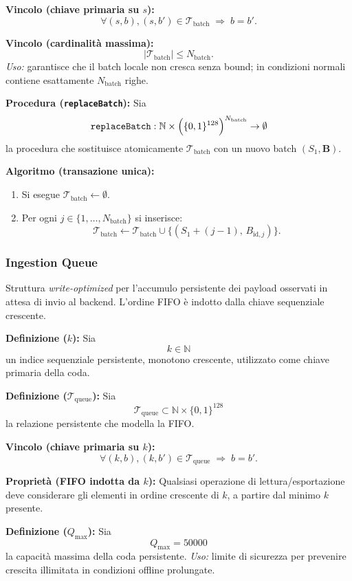 \documentclass[a4paper,11pt,table,dvipsnames]{article}
\begin{document}
\textbf{Vincolo (chiave primaria su \(s\)):}
\[
    \forall (s,b),(s,b') \in \mathcal{T}_{\text{batch}} \;\Rightarrow\; b=b'.
\]

\textbf{Vincolo (cardinalità massima):}
\[
    |\mathcal{T}_{\text{batch}}| \le N_{\text{batch}}.
\]
\emph{Uso:} garantisce che il batch locale non cresca senza bound; in condizioni normali contiene esattamente \(N_{\text{batch}}\) righe.

\textbf{Procedura (\texttt{replaceBatch}):}
Sia
\[
    \texttt{replaceBatch}: \mathbb{N} \times \Bigl(\{0,1\}^{128}\Bigr)^{N_{\text{batch}}} \rightarrow \emptyset
\]
la procedura che sostituisce atomicamente \(\mathcal{T}_{\text{batch}}\) con un nuovo batch \((S_1,\mathbf{B})\).

\textbf{Algoritmo (transazione unica):}
\begin{enumerate}
    \item Si esegue \(\mathcal{T}_{\text{batch}} \leftarrow \emptyset\).
    \item Per ogni \(j \in \{1,\dots,N_{\text{batch}}\}\) si inserisce:
          \[
              \mathcal{T}_{\text{batch}} \leftarrow \mathcal{T}_{\text{batch}} \cup \{(S_1 + (j-1),\, B_{\text{id},j})\}.
          \]
\end{enumerate}

\subsubsection{Ingestion Queue}
Struttura \emph{write-optimized} per l’accumulo persistente dei payload osservati in attesa di invio al backend.
L’ordine FIFO è indotto dalla chiave sequenziale crescente.

\textbf{Definizione (\(k\)):}
Sia
\[
    k \in \mathbb{N}
\]
un indice sequenziale persistente, monotono crescente, utilizzato come chiave primaria della coda.

\textbf{Definizione (\(\mathcal{T}_{\text{queue}}\)):}
Sia
\[
    \mathcal{T}_{\text{queue}} \subset \mathbb{N} \times \{0,1\}^{128}
\]
la relazione persistente che modella la FIFO.

\textbf{Vincolo (chiave primaria su \(k\)):}
\[
    \forall (k,b),(k,b') \in \mathcal{T}_{\text{queue}} \;\Rightarrow\; b=b'.
\]

\textbf{Proprietà (FIFO indotta da \(k\)):}
Qualsiasi operazione di lettura/esportazione deve considerare gli elementi in ordine crescente di \(k\), a partire dal minimo \(k\) presente.

\textbf{Definizione (\(Q_{\max}\)):}
Sia
\[
    Q_{\max} = 50000
\]
la capacità massima della coda persistente.
\emph{Uso:} limite di sicurezza per prevenire crescita illimitata in condizioni offline prolungate.
\end{document}
